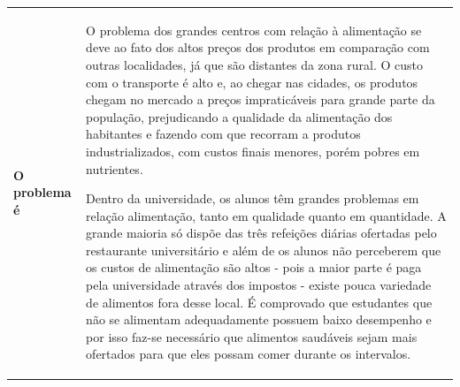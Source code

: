   \begin{table}[!htb]
    \centering
    \begin{tabular}{p{3cm}p{13cm}}
      \toprule
      \textbf{O problema é}                        & O problema dos grandes centros com relação à alimentação se deve ao fato dos altos
                                                     preços dos produtos em comparação com outras localidades, já que são distantes
                                                     da zona rural. O custo com o transporte é alto e, ao chegar nas cidades, os produtos
                                                     chegam no mercado a preços impraticáveis para grande parte da população, prejudicando
                                                     a qualidade da alimentação dos habitantes e fazendo com que recorram a produtos
                                                     industrializados, com custos finais menores, porém pobres em nutrientes.

                                                     Dentro da universidade, os alunos têm grandes problemas em relação alimentação,
                                                     tanto em qualidade quanto em quantidade. A grande maioria só dispõe
                                                     das três refeições diárias ofertadas pelo restaurante universitário e além de os
                                                     alunos não perceberem que os custos de alimentação são altos - pois a maior parte é
                                                     paga pela universidade através dos impostos - existe pouca variedade de alimentos
                                                     fora desse local. É comprovado que estudantes que não se alimentam adequadamente
                                                     possuem baixo desempenho e por isso faz-se necessário que alimentos saudáveis sejam
                                                     mais ofertados para que eles possam comer durante os intervalos.


\end{tabular}
\end{table}
